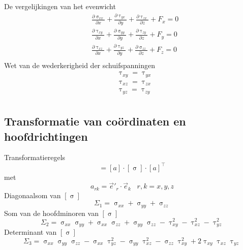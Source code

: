             De vergelijkingen van het evenwicht
            \begin{align}
                &\frac{\partial \upsigma_{xx}}{\partial x} + \frac{\partial \uptau_{yx}}{\partial y} + \frac{\partial \uptau_{zx}}{\partial z} + F_x = 0\nonumber\\
                &\frac{\partial \uptau_{xy}}{\partial x} + \frac{\partial \upsigma_{yy}}{\partial y} + \frac{\partial \uptau_{zy}}{\partial z} + F_y = 0\nonumber\\
                &\frac{\partial \uptau_{xz}}{\partial x} + \frac{\partial \uptau_{yz}}{\partial y} + \frac{\partial \upsigma_{zz}}{\partial z} + F_z = 0\nonumber\\
                \label{vergelijkingen_van_het_evenwicht}
            \end{align}
            Wet van de wederkerigheid der schuifspanningen
            \begin{align}
                &\uptau_{xy} = \uptau_{yx}\nonumber\\
                &\uptau_{xz} = \uptau_{zx}\nonumber\\
                &\uptau_{yz} = \uptau_{zy}\nonumber\\
            \end{align}

        \subsection{Transformatie van coördinaten en hoofdrichtingen}

            Transformatieregels
            \begin{equation}
                [\upsigma'] = [a]\cdot[\upsigma]\cdot[a]^{\top}
                \label{spanningstransformatie}
            \end{equation}
            met
            \begin{equation}
                a_{rk} = \vec{e}'_r\cdot\vec{e}_k \;\;\; r,k=x,y,z
                \label{Transformatiematrixelementen}
            \end{equation}
            Diagonaalsom van $[\upsigma]$
            \begin{equation}
                \Sigma_1 = \upsigma_{xx} + \upsigma_{yy} + \upsigma_{zz}
                \label{Diagonaalsom_sigma}
            \end{equation}
            Som van de hoofdminoren van $[\upsigma]$
            \begin{equation}
                \Sigma_2 = \upsigma_{xx}\upsigma_{yy} + \upsigma_{xx}\upsigma_{zz} + \upsigma_{yy}\upsigma_{zz} - \uptau_{xy}^2 - \uptau_{xz}^2 - \uptau_{yz}^2
                \label{Hoofdminoren_sigma}
            \end{equation}
            Determinant van $[\upsigma]$
            \begin{equation}
                \Sigma_3 = \upsigma_{xx}\upsigma_{yy}\upsigma_{zz} - \upsigma_{xx}\uptau_{yz}^2-\upsigma_{yy}\uptau_{xz}^2-\upsigma_{zz}\uptau_{xy}^2+2\uptau_{xy}\uptau_{xz}\uptau_{yz}
                \label{Determinant_sigma}
            \end{equation}

